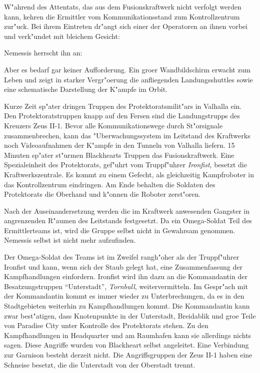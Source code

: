 
W"ahrend des Attentats, das aus dem Fusionskraftwerk nicht verfolgt werden kann, kehren die Ermittler vom Kommunikationsstand zum Kontrollzentrum zur"uck. Bei ihrem Eintreten dr"angt sich einer der Operatoren an ihnen vorbei und verk"undet mit bleichem Gesicht:

 Nemessis herrscht ihn an: 

Aber es bedarf gar keiner Aufforderung. Ein gro\3er Wandbildschirm erwacht zum Leben und zeigt in starker Vergr"o\3erung die anfliegenden Landungsshuttles sowie eine schematische Darstellung der K"ampfe im Orbit.

Kurze Zeit sp"ater dringen Truppen des Protektoratsmilit"ars in Valhalla ein. Den Protektoratstruppen knapp auf den Fersen sind die Landungstrupps des Kreuzers Zeus II-1. Bevor alle Kommunikationswege durch St"orsignale zusammenbrechen, kann das "Uberwachungssystem im Leitstand des Kraftwerks noch Videoaufnahmen der K"ampfe in den Tunneln von Valhalla liefern. 15 Minuten sp"ater st"urmen Blackhearts Truppen das Fusionskraftwerk. Eine Spezialeinheit des Protektorats, gef"uhrt vom Truppf"uhrer \emph{Ironfist}, besetzt die Kraftwerkszentrale. Es kommt zu einem Gefecht, als gleichzeitig Kampfroboter in das Kontrollzentrum eindringen. Am Ende behalten die Soldaten des Protektorats die Oberhand und k"onnen die Roboter zerst"oren.

Nach der Auseinandersetzung werden die im Kraftwerk anwesenden Gangster in angrenzenden R"aumen des Leitstands festgesetzt. Da ein Omega-Soldat Teil des Ermittlerteams ist, wird die Gruppe selbst nicht in Gewahrsam genommen. Nemessis selbst ist nicht mehr aufzufinden.

Der Omega-Soldat des Teams ist im Zweifel rangh"oher als der Truppf"uhrer Ironfist und kann, wenn sich der Staub gelegt hat, eine Zusammenfassung der Kampfhandlungen einfordern. Ironfist wird ihn dazu an die Kommandantin der Besatzungstruppen ``Unterstadt'', \emph{Tornbull}, weitervermitteln. Im Gespr"ach mit der Kommandantin kommt es immer wieder zu Unterbrechungen, da es in den Stadtgebieten weiterhin zu Kampfhandlungen kommt. Die Kommandantin kann zwar best"atigen, dass Knotenpunkte in der Unterstadt, Breidablik und gro\3e Teile von Paradise City unter Kontrolle des Protektorats stehen. Zu den Kampfhandlungen in Headquarter und am Raumhafen kann sie allerdings nichts sagen. Diese Angriffe wurden von Blackheart selbst angeleitet. Eine Verbindung zur Garnison besteht derzeit nicht. Die Angriffsgruppen der Zeus II-1 haben eine Schneise besetzt, die die Unterstadt von der Oberstadt trennt.

